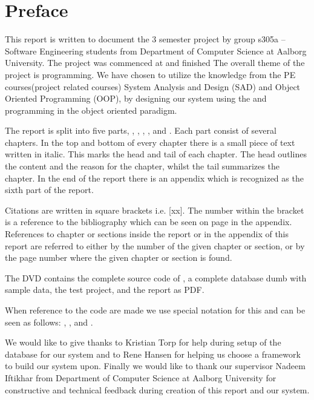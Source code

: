 \chapter*{Preface}
\label{chap:preface}
%
\emptyTop{}%
\vspace{-15mm}%
This report is written to document the 3\rd{} semester project by group s305a -- Software Engineering students from Department of Computer Science at Aalborg University. 
The project was commenced at  and finished 
The overall theme of the project is programming. 
We have chosen to utilize the knowledge from the PE courses(project related courses) System Analysis and Design (SAD) and Object Oriented Programming (OOP), by designing our system using the \ooad and programming \hdesk[] in the object oriented paradigm.  

The report is split into five parts, , , , , and . Each part consist of several chapters. In the top and bottom of every chapter there is a small piece of text written in italic. This marks the head and tail of each chapter. The head outlines the content and the reason for the chapter, whilst the tail summarizes the chapter.
In the end of the report there is an appendix which is recognized as the sixth part of the report.

Citations are written in square brackets i.e. [xx]. The number within the bracket is a reference to the bibliography which can be seen on page \pageref{chap:bib} in the appendix.
References to chapter or sections inside the report or in the appendix of this report are referred to either by the number of the given chapter or section, or by the page number where the given chapter or section is found.

The DVD contains the complete source code of \hdesk[], a complete database dumb with sample data, the test project, and the report as PDF.  

When reference to the code are made we use special notation for this and can be seen as follows: , ,  and .

We would like to give thanks to Kristian Torp for help during setup of the database for our system and to Rene Hansen for helping us choose a framework to build our system upon.
Finally we would like to thank our supervisor Nadeem Iftikhar from Department of Computer Science at Aalborg University for constructive and technical feedback during creation of this report and our system.